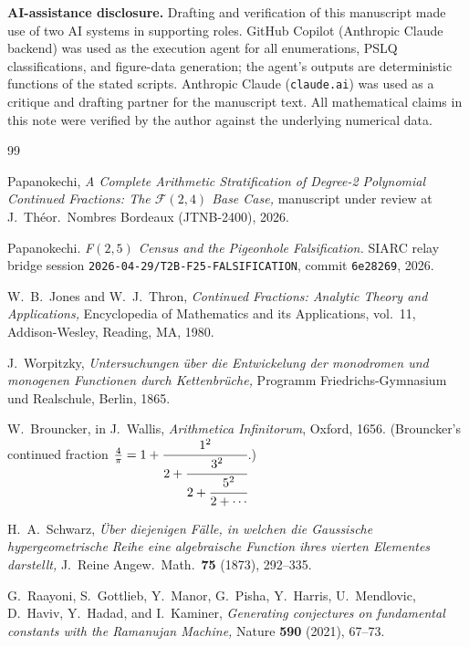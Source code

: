 \documentclass[11pt]{amsart}
\theoremstyle{definition}
\theoremstyle{remark}
\newcommand{\FF}{\mathcal{F}}
\begin{document}
\textbf{AI-assistance disclosure.}  Drafting and verification of this
manuscript made use of two AI systems in supporting roles.
GitHub Copilot (Anthropic Claude backend) was used as the execution
agent for all enumerations, PSLQ classifications, and figure-data
generation; the agent's outputs are deterministic functions of the
stated scripts.  Anthropic Claude (\texttt{claude.ai}) was used as a
critique and drafting partner for the manuscript text.  All
mathematical claims in this note were verified by the author against
the underlying numerical data.

\begin{thebibliography}{99}

Papanokechi,
\emph{A Complete Arithmetic Stratification of Degree-2 Polynomial
Continued Fractions: The $\FF(2,4)$ Base Case,}
manuscript under review at J.~Th\'{e}or.\ Nombres Bordeaux
(JTNB-2400), 2026.

Papanokechi.
\emph{F$(2,5)$ Census and the Pigeonhole Falsification.}
SIARC relay bridge session
\texttt{2026-04-29/T2B-F25-FALSIFICATION}, commit \texttt{6e28269},
2026.

W.~B.~Jones and W.~J.~Thron,
\emph{Continued Fractions: Analytic Theory and Applications,}
Encyclopedia of Mathematics and its Applications, vol.~11,
Addison-Wesley, Reading, MA, 1980.

J.~Worpitzky,
\emph{Untersuchungen \"uber die Entwickelung der monodromen und
monogenen Functionen durch Kettenbr\"uche,}
Programm Friedrichs-Gymnasium und Realschule, Berlin, 1865.

W.~Brouncker, in J.~Wallis,
\emph{Arithmetica Infinitorum}, Oxford, 1656.
(Brouncker's continued fraction $\tfrac{4}{\pi}
= 1 + \cfrac{1^2}{2 + \cfrac{3^2}{2 + \cfrac{5^2}{2+\cdots}}}$.)

H.~A.~Schwarz,
\emph{\"Uber diejenigen F\"alle, in welchen die Gauss\-ische
hypergeometrische Reihe eine algebraische Function ihres vierten
Elementes darstellt,}
J.\ Reine Angew.\ Math.\ \textbf{75} (1873), 292--335.

G.~Raayoni, S.~Gottlieb, Y.~Manor, G.~Pisha, Y.~Harris, U.~Mendlovic,
D.~Haviv, Y.~Hadad, and I.~Kaminer,
\emph{Generating conjectures on fundamental constants with the
Ramanujan Machine,}
Nature \textbf{590} (2021), 67--73.

\end{thebibliography}
\end{document}
